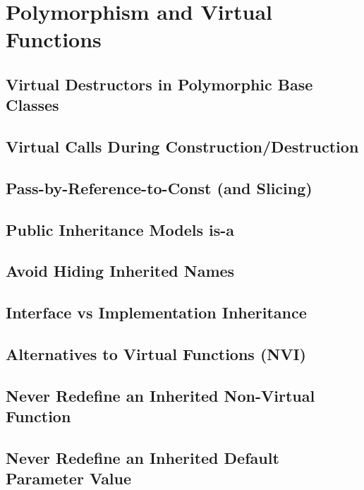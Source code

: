\section{Polymorphism and Virtual Functions}\label{sec:polymorphism}

\subsection{Virtual Destructors in Polymorphic Base Classes}

\subsection{Virtual Calls During Construction/Destruction}

\subsection{Pass-by-Reference-to-Const (and Slicing)}

\subsection{Public Inheritance Models is-a}

\subsection{Avoid Hiding Inherited Names}

\subsection{Interface vs Implementation Inheritance}

\subsection{Alternatives to Virtual Functions (NVI)}

\subsection{Never Redefine an Inherited Non-Virtual Function}

\subsection{Never Redefine an Inherited Default Parameter Value}
